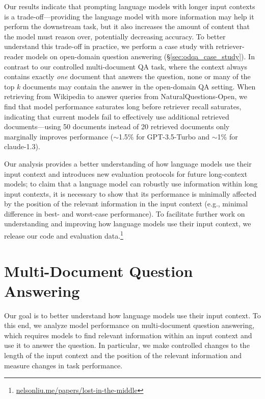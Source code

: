 Our results indicate that prompting language models with longer input contexts is a trade-off---providing the language model with more information may help it perform the downstream task, but it also increases the amount of content that the model must reason over, potentially decreasing accuracy. To better understand this trade-off in practice, we perform a case study with retriever-reader models on open-domain question answering (\S\ref{sec:odqa_case_study}). In contrast to our controlled multi-document QA task, where the context always contains exactly \emph{one} document that answers the question, none or many of the top $k$ documents may contain the answer in the open-domain QA setting. When retrieving from Wikipedia to answer queries from NaturalQuestions-Open, we find that model performance saturates long before retriever recall saturates, indicating that current models fail to effectively use additional retrieved documents---using 50 documents instead of 20 retrieved documents only marginally improves performance ($\sim$1.5\% for GPT-3.5-Turbo and $\sim$1\% for claude-1.3).

Our analysis provides a better understanding of how language models use their input context and introduces new evaluation protocols for future long-context models; to claim that a language model can robustly use information within long input contexts, it is necessary to show that its performance is minimally affected by the position of the relevant information in the input context (e.g., minimal difference in best- and worst-case performance). To facilitate further work on understanding and improving how language models use their input context, we release our code and evaluation data.\footnote{\href{https://nelsonliu.me/papers/lost-in-the-middle}{nelsonliu.me/papers/lost-in-the-middle}}

\section{Multi-Document Question Answering}\label{sec:qa}

Our goal is to better understand how language models use their input context. To this end, we analyze model performance on multi-document question answering, which requires models to find relevant information within an input context and use it to answer the question. In particular, we make controlled changes to the length of the input context and the position of the relevant information and measure changes in task performance.

